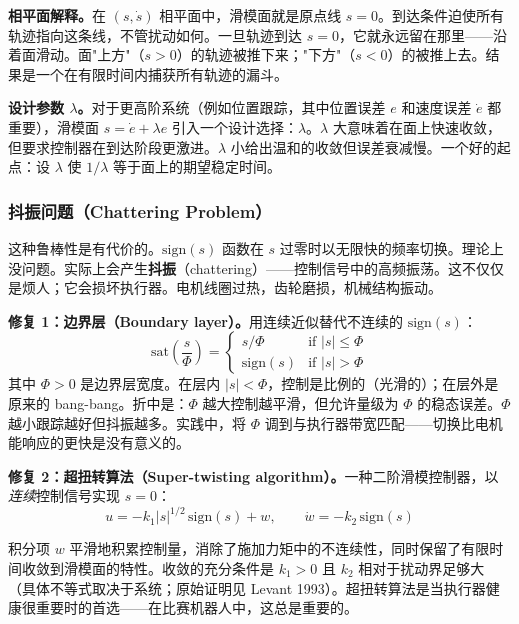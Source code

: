 \textbf{相平面解释。}在 $(s, \dot{s})$ 相平面中，滑模面就是原点线 $s = 0$。到达条件迫使所有轨迹指向这条线，不管扰动如何。一旦轨迹到达 $s = 0$，它就永远留在那里——沿着面滑动。面"上方"（$s > 0$）的轨迹被推下来；"下方"（$s < 0$）的被推上去。结果是一个在有限时间内捕获所有轨迹的漏斗。

\textbf{设计参数 $\lambda$。}对于更高阶系统（例如位置跟踪，其中位置误差 $e$ 和速度误差 $\dot{e}$ 都重要），滑模面 $s = \dot{e} + \lambda e$ 引入一个设计选择：$\lambda$。$\lambda$ 大意味着在面上快速收敛，但要求控制器在到达阶段更激进。$\lambda$ 小给出温和的收敛但误差衰减慢。一个好的起点：设 $\lambda$ 使 $1/\lambda$ 等于面上的期望稳定时间。

\subsubsection{抖振问题（Chattering Problem）}

这种鲁棒性是有代价的。$\mathrm{sign}(s)$ 函数在 $s$ 过零时以无限快的频率切换。理论上没问题。实际上会产生\textbf{抖振}（chattering）——控制信号中的高频振荡。这不仅仅是烦人；它会损坏执行器。电机线圈过热，齿轮磨损，机械结构振动。

\textbf{修复 1：边界层（Boundary layer）。}用连续近似替代不连续的 $\mathrm{sign}(s)$：
\begin{equation}
\mathrm{sat}\!\left(\frac{s}{\Phi}\right) = \begin{cases} s/\Phi & \text{if } |s| \leq \Phi \\ \mathrm{sign}(s) & \text{if } |s| > \Phi \end{cases}
\end{equation}
其中 $\Phi > 0$ 是边界层宽度。在层内 $|s| < \Phi$，控制是比例的（光滑的）；在层外是原来的 bang-bang。折中是：$\Phi$ 越大控制越平滑，但允许量级为 $\Phi$ 的稳态误差。$\Phi$ 越小跟踪越好但抖振越多。实践中，将 $\Phi$ 调到与执行器带宽匹配——切换比电机能响应的更快是没有意义的。

\textbf{修复 2：超扭转算法（Super-twisting algorithm）。}一种二阶滑模控制器，以\textit{连续}控制信号实现 $s = 0$：
\begin{equation}
u = -k_1 |s|^{1/2}\,\mathrm{sign}(s) + w, \qquad \dot{w} = -k_2\,\mathrm{sign}(s)
\end{equation}

积分项 $w$ 平滑地积累控制量，消除了施加力矩中的不连续性，同时保留了有限时间收敛到滑模面的特性。收敛的充分条件是 $k_1 > 0$ 且 $k_2$ 相对于扰动界足够大（具体不等式取决于系统；原始证明见 Levant 1993）。超扭转算法是当执行器健康很重要时的首选——在比赛机器人中，这总是重要的。

